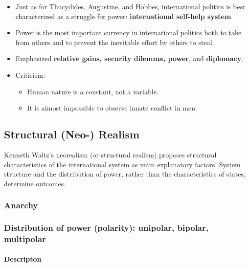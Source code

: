 \documentclass[
]{book}
\begin{document}
\begin{itemize}
\item
  Just as for Thucydides, Augustine, and Hobbes, international politics is best characterized as a struggle for power: \textbf{international self-help system}
\item
  Power is the most important currency in international politics both to take from others and to prevent the inevitable effort by others to steal.
\item
  Emphasized \textbf{relative gains, security dilemma, power}, and \textbf{diplomacy}.
\item
  Criticism:

  \begin{itemize}
  \item
    Human nature is a constant, not a variable.
  \item
    It is almost impossible to observe innate conflict in men.
  \end{itemize}
\end{itemize}

\hypertarget{structural-neo--realism}{%
\subsection{Structural (Neo-) Realism}\label{structural-neo--realism}}

Kenneth Waltz's neorealism (or structural realism) proposes structural characteristics of the international system as main explanatory factors. System structure and the distribution of power, rather than the characteristics of states, determine outcomes.

\hypertarget{anarchy}{%
\subsubsection{Anarchy}\label{anarchy}}

\hypertarget{distribution-of-power-polarity-unipolar-bipolar-multipolar}{%
\subsubsection{Distribution of power (polarity): unipolar, bipolar, multipolar}\label{distribution-of-power-polarity-unipolar-bipolar-multipolar}}

\hypertarget{descripton}{%
\paragraph{Descripton}\label{descripton}}
\end{document}
